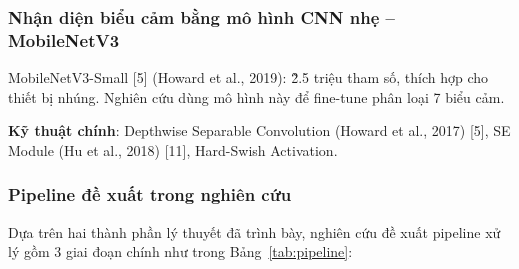 \subsubsection{Nhận diện biểu cảm bằng mô hình CNN nhẹ – MobileNetV3}
MobileNetV3-Small [5] (Howard et al., 2019): \~2.5 triệu tham số, thích hợp cho thiết bị nhúng. Nghiên cứu dùng mô hình này để fine-tune phân loại 7 biểu cảm.\par
\textbf{Kỹ thuật chính}: Depthwise Separable Convolution (Howard et al., 2017) [5], SE Module (Hu et al., 2018) [11], Hard-Swish Activation.

\subsubsection{Pipeline đề xuất trong nghiên cứu}

Dựa trên hai thành phần lý thuyết đã trình bày, nghiên cứu đề xuất pipeline xử lý gồm 3 giai đoạn chính như trong Bảng~\ref{tab:pipeline}:

